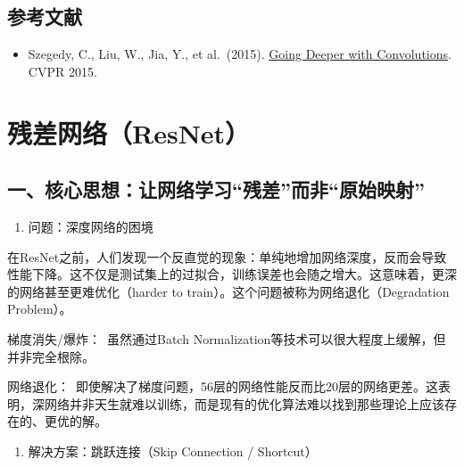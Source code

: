\hypertarget{ux53c2ux8003ux6587ux732e-13}{%
\subsection{参考文献}\label{ux53c2ux8003ux6587ux732e-13}}

\vspace{0.25em}
\begin{itemize}
\tightlist
\item
  Szegedy, C., Liu, W., Jia, Y., et al.~(2015). \href{https://arxiv.org/abs/1409.4842}{Going Deeper with Convolutions}. CVPR 2015.
\end{itemize}

\clearpage

\hypertarget{ux6b8bux5deeux7f51ux7edcresnet}{%
\section{残差网络（ResNet）}\label{ux6b8bux5deeux7f51ux7edcresnet}}

\hypertarget{ux4e00ux6838ux5fc3ux601dux60f3ux8ba9ux7f51ux7edcux5b66ux4e60ux6b8bux5deeux800cux975eux539fux59cbux6620ux5c04}{%
\subsection{一、核心思想：让网络学习``残差''而非``原始映射''}\label{ux4e00ux6838ux5fc3ux601dux60f3ux8ba9ux7f51ux7edcux5b66ux4e60ux6b8bux5deeux800cux975eux539fux59cbux6620ux5c04}}

\begin{enumerate}
\def\labelenumi{\arabic{enumi}.}
\tightlist
\item
  问题：深度网络的困境
\end{enumerate}

在ResNet之前，人们发现一个反直觉的现象：单纯地增加网络深度，反而会导致性能下降。这不仅是测试集上的过拟合，训练误差也会随之增大。这意味着，更深的网络甚至更难优化（harder to train）。这个问题被称为网络退化（Degradation Problem）。

梯度消失/爆炸：~虽然通过Batch Normalization等技术可以很大程度上缓解，但并非完全根除。

网络退化：~即使解决了梯度问题，56层的网络性能反而比20层的网络更差。这表明，深网络并非天生就难以训练，而是现有的优化算法难以找到那些理论上应该存在的、更优的解。

\begin{enumerate}
\def\labelenumi{\arabic{enumi}.}
\setcounter{enumi}{1}
\tightlist
\item
  解决方案：跳跃连接（Skip Connection / Shortcut）
\end{enumerate}

